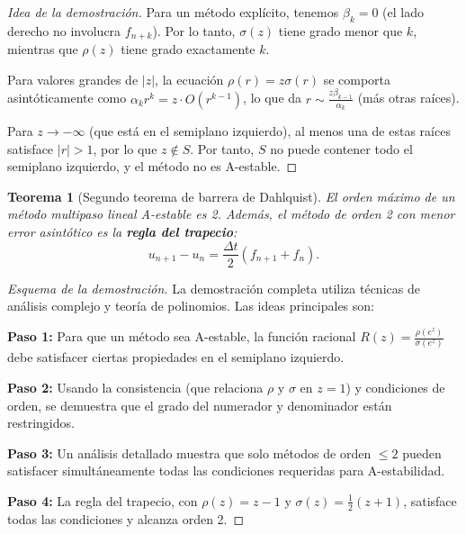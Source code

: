 \documentclass[a4paper,11pt]{report}
\newtheorem{theorem}{Teorema}[chapter]
\begin{document}
\begin{proof}[Idea de la demostración]
Para un método explícito, tenemos $\beta_k = 0$ (el lado derecho no involucra $f_{n+k}$). Por lo tanto, $\sigma(z)$ tiene grado menor que $k$, mientras que $\rho(z)$ tiene grado exactamente $k$.

Para valores grandes de $|z|$, la ecuación $\rho(r) = z\sigma(r)$ se comporta asintóticamente como $\alpha_k r^k = z \cdot O(r^{k-1})$, lo que da $r \sim \frac{z\beta_{k-1}}{\alpha_k}$ (más otras raíces).

Para $z \to -\infty$ (que está en el semiplano izquierdo), al menos una de estas raíces satisface $|r| > 1$, por lo que $z \notin S$. Por tanto, $S$ no puede contener todo el semiplano izquierdo, y el método no es A-estable.
\end{proof}

\begin{theorem}[Segundo teorema de barrera de Dahlquist]
El orden máximo de un método multipaso lineal A-estable es 2. Además, el método de orden 2 con menor error asintótico es la \textbf{regla del trapecio}:
\[
u_{n+1} - u_n = \frac{\Delta t}{2}(f_{n+1} + f_n).
\]
\end{theorem}

\begin{proof}[Esquema de la demostración]
La demostración completa utiliza técnicas de análisis complejo y teoría de polinomios. Las ideas principales son:

\textbf{Paso 1:} Para que un método sea A-estable, la función racional $R(z) = \frac{\rho(e^z)}{\sigma(e^z)}$ debe satisfacer ciertas propiedades en el semiplano izquierdo.

\textbf{Paso 2:} Usando la consistencia (que relaciona $\rho$ y $\sigma$ en $z = 1$) y condiciones de orden, se demuestra que el grado del numerador y denominador están restringidos.

\textbf{Paso 3:} Un análisis detallado muestra que solo métodos de orden $\leq 2$ pueden satisfacer simultáneamente todas las condiciones requeridas para A-estabilidad.

\textbf{Paso 4:} La regla del trapecio, con $\rho(z) = z - 1$ y $\sigma(z) = \frac{1}{2}(z + 1)$, satisface todas las condiciones y alcanza orden 2.
\end{proof}
\end{document}
